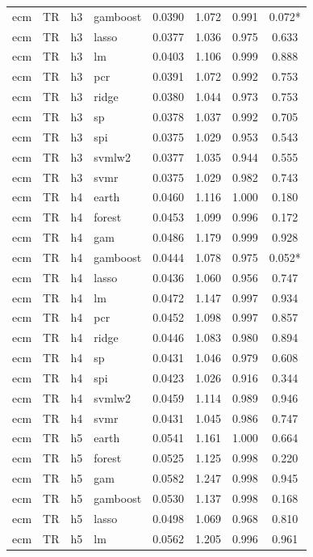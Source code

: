 \begin{ThreePartTable}
\begin{longtable}[t]{llclcccc}
ecm & TR & h3 & gamboost & 0.0390 & 1.072 & 0.991 & 0.072*\\
ecm & TR & h3 & lasso & 0.0377 & 1.036 & 0.975 & 0.633\\
ecm & TR & h3 & lm & 0.0403 & 1.106 & 0.999 & 0.888\\
ecm & TR & h3 & pcr & 0.0391 & 1.072 & 0.992 & 0.753\\
ecm & TR & h3 & ridge & 0.0380 & 1.044 & 0.973 & 0.753\\
ecm & TR & h3 & sp & 0.0378 & 1.037 & 0.992 & 0.705\\
ecm & TR & h3 & spi & 0.0375 & 1.029 & 0.953 & 0.543\\
ecm & TR & h3 & svmlw2 & 0.0377 & 1.035 & 0.944 & 0.555\\
ecm & TR & h3 & svmr & 0.0375 & 1.029 & 0.982 & 0.743\\
\addlinespace
ecm & TR & h4 & earth & 0.0460 & 1.116 & 1.000 & 0.180\\
ecm & TR & h4 & forest & 0.0453 & 1.099 & 0.996 & 0.172\\
ecm & TR & h4 & gam & 0.0486 & 1.179 & 0.999 & 0.928\\
ecm & TR & h4 & gamboost & 0.0444 & 1.078 & 0.975 & 0.052*\\
ecm & TR & h4 & lasso & 0.0436 & 1.060 & 0.956 & 0.747\\
ecm & TR & h4 & lm & 0.0472 & 1.147 & 0.997 & 0.934\\
ecm & TR & h4 & pcr & 0.0452 & 1.098 & 0.997 & 0.857\\
ecm & TR & h4 & ridge & 0.0446 & 1.083 & 0.980 & 0.894\\
ecm & TR & h4 & sp & 0.0431 & 1.046 & 0.979 & 0.608\\
ecm & TR & h4 & spi & 0.0423 & 1.026 & 0.916 & 0.344\\
ecm & TR & h4 & svmlw2 & 0.0459 & 1.114 & 0.989 & 0.946\\
ecm & TR & h4 & svmr & 0.0431 & 1.045 & 0.986 & 0.747\\
\addlinespace
ecm & TR & h5 & earth & 0.0541 & 1.161 & 1.000 & 0.664\\
ecm & TR & h5 & forest & 0.0525 & 1.125 & 0.998 & 0.220\\
ecm & TR & h5 & gam & 0.0582 & 1.247 & 0.998 & 0.945\\
ecm & TR & h5 & gamboost & 0.0530 & 1.137 & 0.998 & 0.168\\
ecm & TR & h5 & lasso & 0.0498 & 1.069 & 0.968 & 0.810\\
ecm & TR & h5 & lm & 0.0562 & 1.205 & 0.996 & 0.961\\

\end{longtable}
\end{ThreePartTable}
